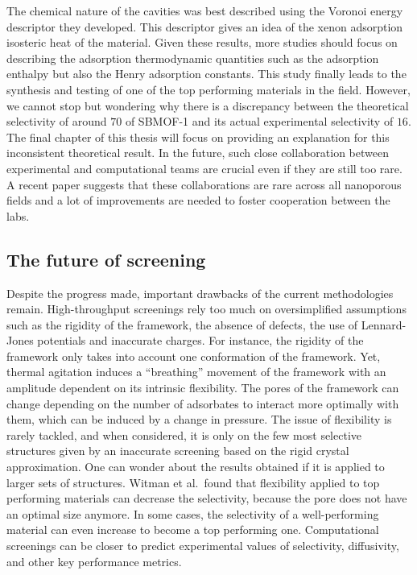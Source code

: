 \documentclass[main.tex]{subfiles}
\begin{document}
The chemical nature of the cavities was best described using the Voronoi energy descriptor they developed. This descriptor gives an idea of the xenon adsorption isosteric heat of the material. Given these results, more studies should focus on describing the adsorption thermodynamic quantities such as the adsorption enthalpy but also the Henry adsorption constants. This study finally leads to the synthesis and testing of one of the top performing materials in the field. However, we cannot stop but wondering why there is a discrepancy between the theoretical selectivity of around $70$ of SBMOF-1 and its actual experimental selectivity of $16$. The final chapter of this thesis will focus on providing an explanation for this inconsistent theoretical result. In the future, such close collaboration between experimental and computational teams are crucial even if they are still too rare. A recent paper suggests that these collaborations are rare across all nanoporous fields and a lot of improvements are needed to foster cooperation between the labs.\autocite{Li_2022}


\subsection{The future of screening}

Despite the progress made, important drawbacks of the current methodologies remain. High-throughput screenings rely too much on oversimplified assumptions such as the rigidity of the framework, the absence of defects, the use of Lennard-Jones potentials and inaccurate charges. For instance, the rigidity of the framework only takes into account one conformation of the framework. Yet, thermal agitation induces a ``breathing'' movement of the framework with an amplitude dependent on its intrinsic flexibility. The pores of the framework can change depending on the number of adsorbates to interact more optimally with them, which can be induced by a change in pressure. The issue of flexibility is rarely tackled, and when considered, it is only on the few most selective structures given by an inaccurate screening based on the rigid crystal approximation. One can wonder about the results obtained if it is applied to larger sets of structures. Witman et al.\ found that flexibility applied to top performing materials can decrease the selectivity, because the pore does not have an optimal size anymore.\autocite{Witman_2017} In some cases, the selectivity of a well-performing material can even increase to become a top performing one. Computational screenings can be closer to predict experimental values of selectivity, diffusivity, and other key performance metrics.
\end{document}

